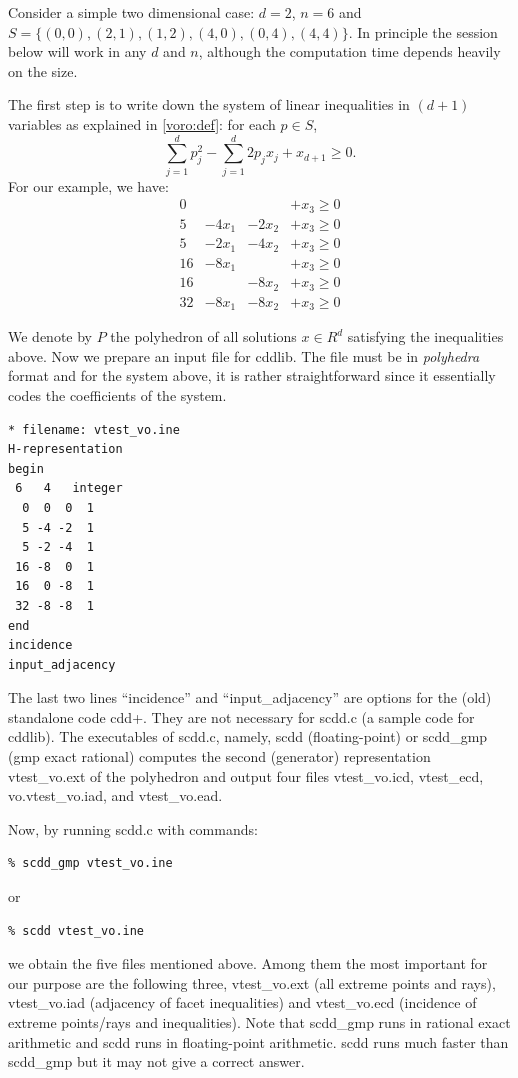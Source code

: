 \documentclass[a4paper,12pt]{article}
\begin{document}
\begin{small}
Consider a simple two dimensional case: $d=2$, $n=6$ and
 $S = \{(0,0), (2,1), (1,2), (4,0), (0,4),(4,4) \}$.  In principle
the session below will work in any $d$ and $n$, although 
the computation time depends heavily on the size.

The first step is to write down the system of linear inequalities
in $(d+1)$ variables as explained in \ref{voro:def}:
for each $p\in S$,
\[
\sum_{j=1}^d p_j^2 - \sum_{j=1}^d 2 p_j x_j + x_{d+1} \ge 0.
\]
For our example, we have:
\[
\begin{array}{rrrr}
  0 &        &        & + x_3 \ge 0\\
  5 & -4 x_1 & -2 x_2 & + x_3 \ge 0\\
  5 & -2 x_1 & -4 x_2 & + x_3 \ge 0\\
 16 & -8 x_1 &        & + x_3 \ge 0\\
 16 &        & -8 x_2 & + x_3 \ge 0\\
 32 & -8 x_1 & -8 x_2 & + x_3 \ge 0
\end{array}
\]


We denote by $P$ the polyhedron of all solutions $x\in R^d$
satisfying the inequalities above.
Now we prepare an input file for cddlib.  The file must 
be in {\em polyhedra\/} format and for the system above,
it is rather straightforward since it essentially
codes the coefficients of the system.

\begin{verbatim}
* filename: vtest_vo.ine
H-representation
begin
 6   4   integer
  0  0  0  1
  5 -4 -2  1
  5 -2 -4  1
 16 -8  0  1
 16  0 -8  1
 32 -8 -8  1
end
incidence
input_adjacency
\end{verbatim}

\noindent
The last two lines ``incidence'' and ``input\_adjacency''
are options for the (old) standalone code cdd+.  They are not necessary
for scdd.c (a sample code for cddlib).   The executables of scdd.c, namely,
scdd (floating-point) or scdd\_gmp (gmp exact rational) computes
the second (generator) representation vtest\_vo.ext of the polyhedron and output
four files vtest\_vo.icd, vtest\_ecd, vo.vtest\_vo.iad, and vtest\_vo.ead.

Now, by running scdd.c with commands:

\begin{verbatim}
% scdd_gmp vtest_vo.ine
\end{verbatim}
or
\begin{verbatim}
% scdd vtest_vo.ine
\end{verbatim}
we obtain the five files mentioned above.  
Among them the most important for our purpose are
the following three, vtest\_vo.ext (all extreme points and rays), 
vtest\_vo.iad (adjacency of facet inequalities) and 
vtest\_vo.ecd (incidence of extreme points/rays and inequalities).  Note
that scdd\_gmp runs in rational exact arithmetic and scdd runs in
floating-point arithmetic.  scdd runs much faster than scdd\_gmp but
it may not give a correct answer.


\end{small}
\end{document}
